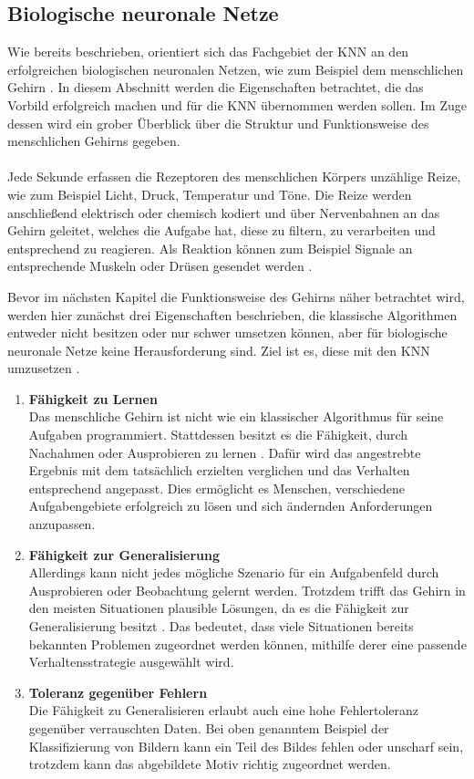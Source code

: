 \subsection{Biologische neuronale Netze}
\label{subsec:biological_neuraL_networks}
Wie bereits beschrieben, orientiert sich das Fachgebiet der \ac{KNN} an den erfolgreichen biologischen neuronalen Netzen, wie zum Beispiel dem menschlichen Gehirn \cite{kriesel2008kleiner}. In diesem Abschnitt werden die Eigenschaften betrachtet, die das Vorbild erfolgreich machen und für die \ac{KNN} übernommen werden sollen. Im Zuge dessen wird ein grober Überblick über die Struktur und Funktionsweise des menschlichen Gehirns gegeben. 
\\\\
Jede Sekunde erfassen die Rezeptoren des menschlichen Körpers unzählige Reize, wie zum Beispiel Licht, Druck, Temperatur und Töne. Die Reize werden anschließend elektrisch oder chemisch kodiert und über Nervenbahnen an das Gehirn geleitet, welches die Aufgabe hat, diese zu filtern, zu verarbeiten und entsprechend zu reagieren. Als Reaktion können zum Beispiel Signale an entsprechende Muskeln oder Drüsen gesendet werden \cite{kinnebrock2018neuronale}. 

Bevor im nächsten Kapitel die Funktionsweise des Gehirns näher betrachtet wird, werden hier zunächst drei Eigenschaften beschrieben, die klassische Algorithmen entweder nicht besitzen oder nur schwer umsetzen können, aber für biologische neuronale Netze keine Herausforderung sind. Ziel ist es, diese mit den \ac{KNN} umzusetzen \cite{kriesel2008kleiner}.
\begin{enumerate}
	\item \textbf{ Fähigkeit zu Lernen} \\
	Das menschliche Gehirn ist nicht wie ein klassischer Algorithmus für seine Aufgaben programmiert. Stattdessen besitzt es die Fähigkeit, durch Nachahmen oder Ausprobieren zu lernen \cite{kriesel2008kleiner}. Dafür wird das angestrebte Ergebnis mit dem tatsächlich erzielten verglichen und das Verhalten entsprechend angepasst. Dies ermöglicht es Menschen, verschiedene Aufgabengebiete erfolgreich zu lösen und sich ändernden Anforderungen anzupassen.
	
	\item \textbf{Fähigkeit zur Generalisierung}\\
	Allerdings kann nicht jedes mögliche Szenario für ein Aufgabenfeld durch Ausprobieren oder Beobachtung gelernt werden. Trotzdem trifft das Gehirn in den meisten Situationen plausible Lösungen, da es die Fähigkeit zur Generalisierung besitzt 
	\cite{kriesel2008kleiner}. Das bedeutet, dass viele Situationen bereits bekannten Problemen zugeordnet werden können, mithilfe derer eine passende Verhaltensstrategie ausgewählt wird. 
	
	\item \textbf{Toleranz gegenüber Fehlern}\\
	Die Fähigkeit zu Generalisieren erlaubt auch eine hohe Fehlertoleranz gegenüber verrauschten Daten. Bei oben genanntem Beispiel der Klassifizierung von Bildern kann ein Teil des Bildes fehlen oder unscharf sein, trotzdem kann das abgebildete Motiv richtig zugeordnet werden.
\end{enumerate}

